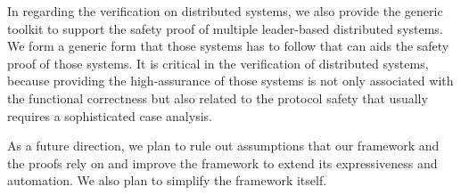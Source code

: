 In regarding the verification on distributed systems,
we also provide the generic toolkit to support the safety proof of multiple leader-based distributed systems. 
We form a generic form that those systems has to follow that can aids the safety proof of those systems. 
It is critical in the verification of distributed systems, 
because providing
the high-assurance of those systems 
is not only associated with the functional correctness
but also related to the protocol safety that usually
requires a sophisticated case analysis.

As a future direction, 
we plan 
to rule out assumptions that 
our framework and the proofs rely on
and improve 
the framework to extend its expressiveness and automation.
We also plan to simplify the framework itself.
